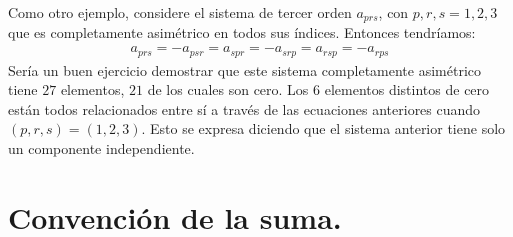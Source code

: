 \documentclass[hidelinks,12pt]{article}
\begin{document}
Como otro ejemplo, considere el sistema de tercer orden $a_{prs}$, con \break \hfill $p, r, s = 1, 2, 3$ que es completamente asimétrico en todos sus índices. Entonces tendríamos:
\begin{align*}
a_{prs} = - a_{psr} = a_{spr} = -a_{srp} = a_{rsp} = -a_{rps}
\end{align*}
Sería un buen ejercicio demostrar que este sistema completamente asimétrico tiene $27$ elementos, $21$ de los cuales son cero. Los $6$ elementos distintos de cero están todos relacionados entre sí a través de las ecuaciones anteriores cuando $(p, r, s) = (1, 2, 3)$. Esto se expresa diciendo que el sistema anterior tiene solo un componente independiente.

\section{Convención de la suma.}
\end{document}
